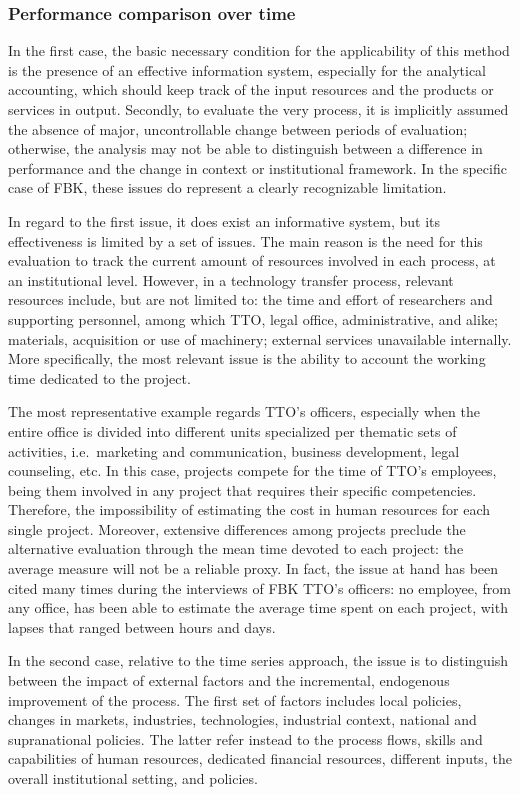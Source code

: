 \subsubsection{Performance comparison over time}

In the first case, the basic necessary condition for the applicability of this method is the presence of an effective information system, especially for the analytical accounting, which should keep track of the input resources and the products or services in output. Secondly, to evaluate the very process, it is implicitly assumed the absence of major, uncontrollable change between periods of evaluation; otherwise, the analysis may not be able to distinguish between a difference in performance and the change in context or institutional framework. In the specific case of FBK, these issues do represent a clearly recognizable limitation. 

In regard to the first issue, it does exist an informative system, but its effectiveness is limited by a set of issues. The main reason is the need for this evaluation to track the current amount of resources involved in each process, at an institutional level. However, in a technology transfer process, relevant resources include, but are not limited to: the time and effort of researchers and supporting personnel, among which TTO, legal office, administrative, and alike; materials, acquisition or use of machinery; external services unavailable internally. More specifically, the most relevant issue is the ability to account the working time dedicated to the project. 

The most representative example regards TTO's officers, especially when the entire office is divided into different units specialized per thematic sets of activities, i.e.\ marketing and communication, business development, legal counseling, etc. In this case, projects compete for the time of TTO's employees, being them involved in any project that requires their specific competencies. Therefore, the impossibility of estimating the cost in human resources for each single project. Moreover, extensive differences among projects preclude the alternative evaluation through the mean time devoted to each project: the average measure will not be a reliable proxy. In fact, the issue at hand has been cited many times during the interviews of FBK TTO's officers: no employee, from any office, has been able to estimate the average time spent on each project, with lapses that ranged between hours and days.

In the second case, relative to the time series approach, the issue is to distinguish between the impact of external factors and the incremental, endogenous improvement of the process. The first set of factors includes local policies, changes in markets, industries, technologies, industrial context, national and supranational policies. The latter refer instead to the process flows, skills and capabilities of human resources, dedicated financial resources, different inputs, the overall institutional setting, and policies.

